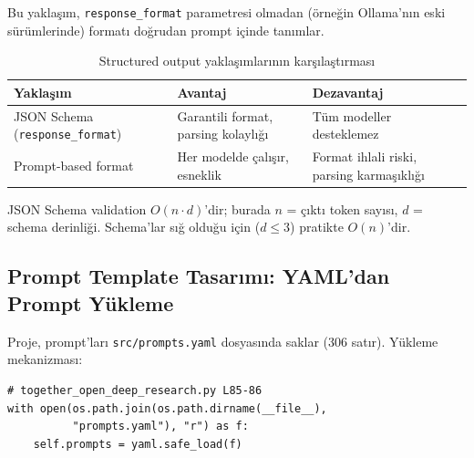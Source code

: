 Bu yakla\c{s}{\i}m, \texttt{response\_format} parametresi olmadan (\"{o}rne\u{g}in Ollama'n{\i}n eski s\"{u}r\"{u}mlerinde) format{\i} do\u{g}rudan prompt i\c{c}inde tan{\i}mlar.

\begin{table}[H]
\centering
\caption{Structured output yakla\c{s}{\i}mlar{\i}n{\i}n kar\c{s}{\i}la\c{s}t{\i}rmas{\i}}
\label{tab:structured-output}
\begin{tabularx}{\textwidth}{lXX}
\toprule
\color{chapterBlue}\textbf{Yakla\c{s}{\i}m} &
\color{chapterBlue}\textbf{Avantaj} &
\color{chapterBlue}\textbf{Dezavantaj} \\
\midrule
JSON Schema (\texttt{response\_format}) & Garantili format, parsing kolayl{\i}\u{g}{\i} & T\"{u}m modeller desteklemez \\
Prompt-based format & Her modelde \c{c}al{\i}\c{s}{\i}r, esneklik & Format ihlali riski, parsing karma\c{s}{\i}kl{\i}\u{g}{\i} \\
\bottomrule
\end{tabularx}
\end{table}

JSON Schema validation $O(n \cdot d)$'dir; burada $n$ = \c{c}{\i}kt{\i} token say{\i}s{\i}, $d$ = schema derinli\u{g}i. Schema'lar s{\i}\u{g} oldu\u{g}u i\c{c}in ($d \leq 3$) pratikte $O(n)$'dir.


\subsection{Prompt Template Tasar{\i}m{\i}: YAML'dan Prompt Y\"{u}kleme}
\label{sec:prompt-template}

Proje, prompt'lar{\i} \texttt{src/prompts.yaml} dosyas{\i}nda saklar (306 sat{\i}r). Y\"{u}kleme mekanizmas{\i}:

\begin{lstlisting}
# together_open_deep_research.py L85-86
with open(os.path.join(os.path.dirname(__file__),
          "prompts.yaml"), "r") as f:
    self.prompts = yaml.safe_load(f)
\end{lstlisting}

